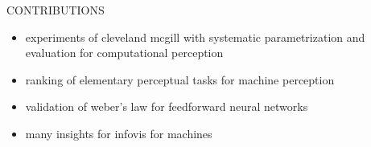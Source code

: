 CONTRIBUTIONS
\begin{itemize}
	\item experiments of cleveland mcgill with systematic parametrization and evaluation for computational perception
	\item ranking of elementary perceptual tasks for machine perception
	\item validation of weber's law for feedforward neural networks
	\item many insights for infovis for machines
\end{itemize}


